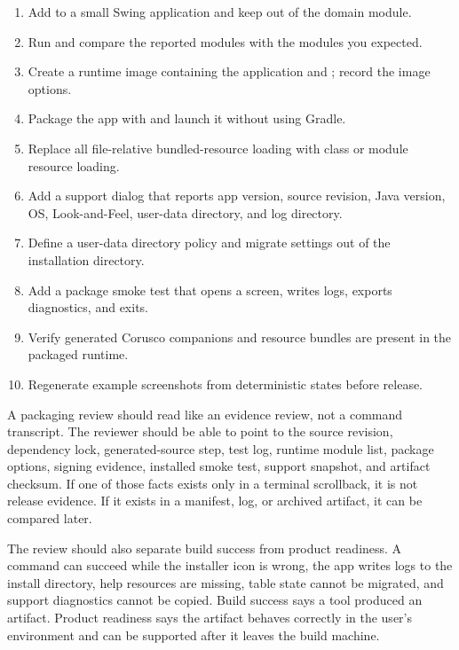 \begin{exercisebox}
\begin{enumerate}
\item Add  to a small Swing application and keep  out of the domain module.
\item Run  and compare the reported modules with the modules you expected.
\item Create a  runtime image containing the application and ; record the image options.
\item Package the app with  and launch it without using Gradle.
\item Replace all file-relative bundled-resource loading with class or module resource loading.
\item Add a support dialog that reports app version, source revision, Java version, OS, Look-and-Feel, user-data directory, and log directory.
\item Define a user-data directory policy and migrate settings out of the installation directory.
\item Add a package smoke test that opens a screen, writes logs, exports diagnostics, and exits.
\item Verify generated Corusco companions and resource bundles are present in the packaged runtime.
\item Regenerate example screenshots from deterministic states before release.
\end{enumerate}
\end{exercisebox}

A packaging review should read like an evidence review, not a command transcript. The reviewer should be able to point to the source revision, dependency lock, generated-source step, test log, runtime module list, package options, signing evidence, installed smoke test, support snapshot, and artifact checksum. If one of those facts exists only in a terminal scrollback, it is not release evidence. If it exists in a manifest, log, or archived artifact, it can be compared later.

The review should also separate build success from product readiness. A  command can succeed while the installer icon is wrong, the app writes logs to the install directory, help resources are missing, table state cannot be migrated, and support diagnostics cannot be copied. Build success says a tool produced an artifact. Product readiness says the artifact behaves correctly in the user's environment and can be supported after it leaves the build machine.


